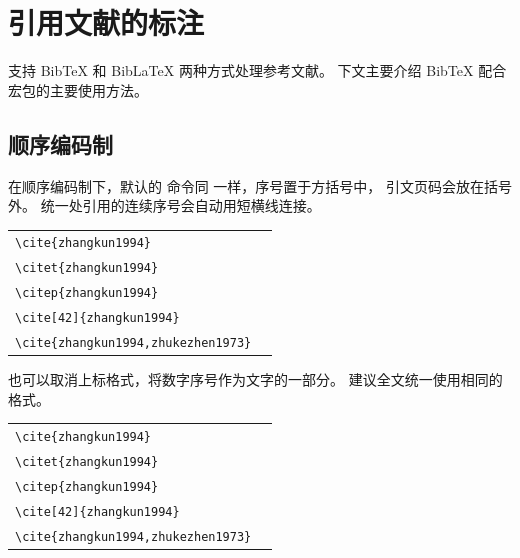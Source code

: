 
\chapter{引用文献的标注}

支持 BibTeX 和 BibLaTeX 两种方式处理参考文献。
下文主要介绍 BibTeX 配合  宏包的主要使用方法。


\section{顺序编码制}

在顺序编码制下，默认的  命令同  一样，序号置于方括号中，
引文页码会放在括号外。
统一处引用的连续序号会自动用短横线连接。

\noindent
\begin{tabular}{l@{\quad$\Rightarrow$\quad}l}
  \verb|\cite{zhangkun1994}|               & \cite{zhangkun1994}               \\
  \verb|\citet{zhangkun1994}|              & \citet{zhangkun1994}              \\
  \verb|\citep{zhangkun1994}|              & \citep{zhangkun1994}              \\
  \verb|\cite[42]{zhangkun1994}|           & \cite[42]{zhangkun1994}           \\
  \verb|\cite{zhangkun1994,zhukezhen1973}| & \cite{zhangkun1994,zhukezhen1973} \\
\end{tabular}


也可以取消上标格式，将数字序号作为文字的一部分。
建议全文统一使用相同的格式。

\noindent
\begin{tabular}{l@{\quad$\Rightarrow$\quad}l}
  \verb|\cite{zhangkun1994}|               & \cite{zhangkun1994}               \\
  \verb|\citet{zhangkun1994}|              & \citet{zhangkun1994}              \\
  \verb|\citep{zhangkun1994}|              & \citep{zhangkun1994}              \\
  \verb|\cite[42]{zhangkun1994}|           & \cite[42]{zhangkun1994}           \\
  \verb|\cite{zhangkun1994,zhukezhen1973}| & \cite{zhangkun1994,zhukezhen1973} \\
\end{tabular}



